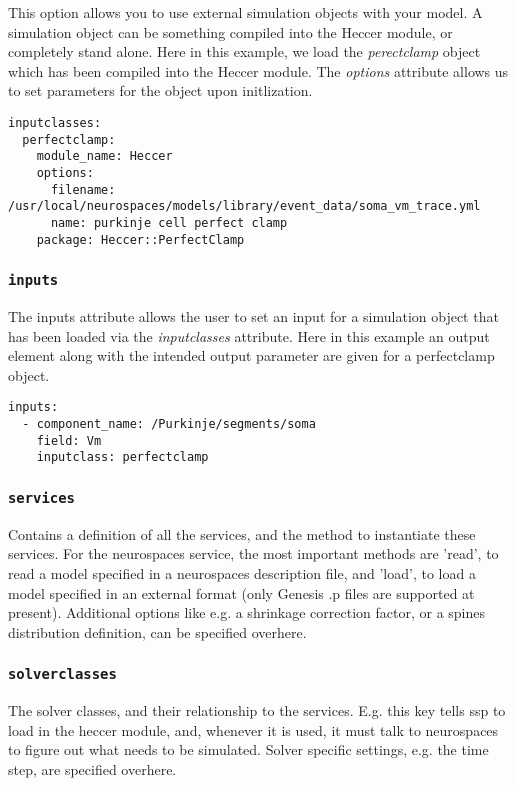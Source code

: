 \documentclass[12pt]{article}
\begin{document}
This option allows you to use external simulation objects with your model. A simulation object can be something compiled into the Heccer module, or completely stand alone. Here in this example, we load the {\it perectclamp} object which has been compiled into the Heccer module. The {\it options} attribute allows us to set parameters for the object upon initlization. 

\begin{verbatim}
inputclasses:
  perfectclamp:
    module_name: Heccer
    options:
      filename: /usr/local/neurospaces/models/library/event_data/soma_vm_trace.yml
      name: purkinje cell perfect clamp
    package: Heccer::PerfectClamp
\end{verbatim}


\subsubsection*{\tt inputs}

The inputs attribute allows the user to set an input for a simulation object that has been loaded via the {\it inputclasses} attribute. Here in this example an output element along with the intended output parameter are given for a perfectclamp object.

\begin{verbatim}
inputs:
  - component_name: /Purkinje/segments/soma
    field: Vm
    inputclass: perfectclamp
\end{verbatim}

\subsubsection*{\tt services}

    Contains a definition of all the services, and the method to instantiate these services. For the neurospaces service, the most important methods are 'read', to read a model specified in a neurospaces description file, and 'load', to load a model specified in an external format (only Genesis .p files are supported at present). Additional options like e.g. a shrinkage correction factor, or a spines distribution definition, can be specified overhere. 

\subsubsection*{\tt solverclasses}

    The solver classes, and their relationship to the services. E.g. this key tells ssp to load in the heccer module, and, whenever it is used, it must talk to neurospaces to figure out what needs to be simulated. Solver specific settings, e.g. the time step, are specified overhere. 
\end{document}
